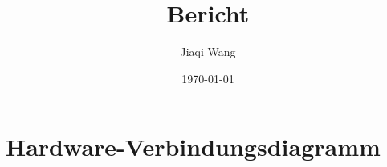 \documentclass[a4paper,12pt]{article}
\title{Bericht}
\author{Jiaqi Wang}
\date{\today}
\begin{document}
\maketitle


\section{Hardware-Verbindungsdiagramm}
\end{document}
